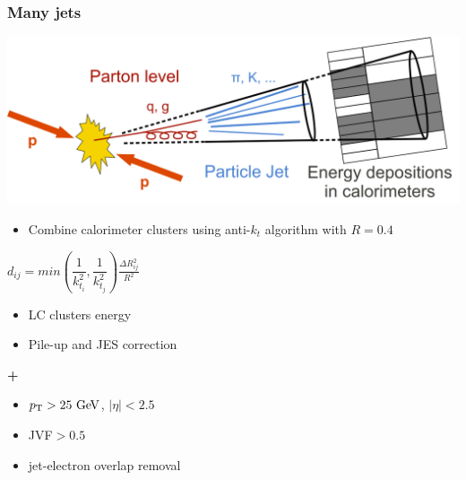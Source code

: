 \begin{frame}\frametitle{Many jets}
\centering\footnotesize

\begin{minipage}{.5\textwidth}\centering

\includegraphics[width=.78\textwidth]{pics/Sketch_PartonParticleCaloJet.png}\\

\begin{itemize}
\item Combine calorimeter clusters using anti-$k_t$ algorithm with $R=0.4$
\end{itemize}
$d_{ij}=min(\dfrac{1}{k_{t_i}^{2}},\dfrac{1}{k_{t_j}^{2}})\frac{\Delta R_{ij}^{2}}{R^{2}}$
\begin{itemize}
\item LC clusters energy
\item Pile-up and JES correction
\end{itemize}
{\cccolor \bfseries +}\\
\begin{itemize}
\item $\pt>25\gev$, $|\eta|<2.5$
\item JVF$>0.5$
\item jet-electron overlap removal
\end{itemize}



\end{minipage}
\end{frame}
